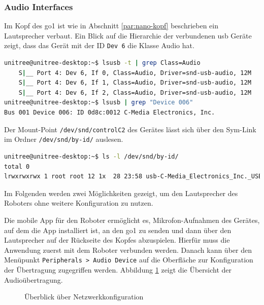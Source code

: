 \subsubsection{Audio Interfaces}
\label{subsubsec:audio-interfaces}

Im Kopf des \gls{go1} ist wie in Abschnitt \ref{par:nano-kopf} beschrieben ein Lautsprecher verbaut.
Ein Blick auf die Hierarchie der verbundenen \gls{usb} Geräte zeigt, dass das Gerät mit der ID \texttt{Dev \num{6}}
die Klasse Audio hat.

\begin{lstlisting}[language=Bash]
unitree@unitree-desktop:~$ lsusb -t | grep Class=Audio
    S|__ Port 4: Dev 6, If 0, Class=Audio, Driver=snd-usb-audio, 12M
    S|__ Port 4: Dev 6, If 1, Class=Audio, Driver=snd-usb-audio, 12M
    S|__ Port 4: Dev 6, If 2, Class=Audio, Driver=snd-usb-audio, 12M
unitree@unitree-desktop:~$ lsusb | grep "Device 006"
Bus 001 Device 006: ID 0d8c:0012 C-Media Electronics, Inc.
\end{lstlisting}

\noindent Der Mount-Point \texttt{/dev/\allowbreak snd/\allowbreak controlC2} des Gerätes lässt sich über den Sym-Link
im Ordner \texttt{/dev/\allowbreak snd/\allowbreak by-id/} auslesen.

\begin{lstlisting}[language=Bash]
unitree@unitree-desktop:~$ ls -l /dev/snd/by-id/
total 0
lrwxrwxrwx 1 root root 12 1x  28 23:58 usb-C-Media_Electronics_Inc._USB_Audio_Device-00 -> ../controlC2
\end{lstlisting}

\noindent Im Folgenden werden zwei Möglichkeiten gezeigt, um den Lautsprecher des Roboters ohne weitere Konfiguration zu nutzen.


Die mobile App für den Roboter ermöglicht es, Mikrofon-Aufnahmen des Gerätes, auf dem die App installiert ist, an den
\gls{go1} zu senden und dann über den Lautsprecher auf der Rückseite des Kopfes abzuspielen.
Hierfür muss die Anwendung zuerst mit dem Roboter verbunden werden.
Danach kann über den Menüpunkt \texttt{Peripherals > Audio Device} auf die Oberfläche zur Konfiguration der Übertragung
zugegriffen werden.
Abbildung \ref{fig:app-audio} zeigt die Übersicht der Audioübertragung.

\begin{figure}[h]
    \caption{Überblick über Netzwerkkonfiguration}\label{fig:app-audio}
\end{figure}

